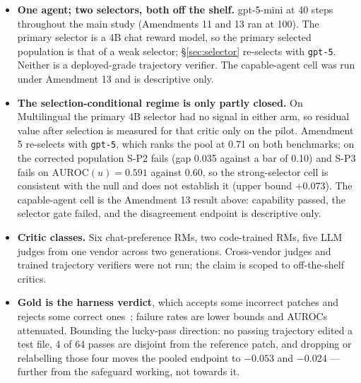 \documentclass[10pt]{article}
\begin{document}
\begin{itemize}[leftmargin=1.2em,itemsep=0pt]
their picks fail more often than the frozen random picks (0.193 and 0.211 against 0.175); the judges return integer scores and tie at the top on 41 and 38 instances, which the readout breaks toward the first attempt --- broken toward the last, \texttt{gpt-6-sol}'s picks fail at the random rate (0.175) and \texttt{gpt-6-luna}'s at 0.202, so for \texttt{gpt-6-sol} the ``worse than random'' reading depends on the tie rule. With no critic above the selector bar of 0.65, the committed sets hold 17 and 19 failures against a floor of 20, and the cell is reported as descriptive only (primary $\Delta$AUROC $+0.020$ [$-0.120$, $+0.149$] on the judge arm). The objection that the null is specific to weak agents is not answered by an equivalence bound; we read it as re-posed as a question about selectors, which is interpretation, not a registered result.
\item \textbf{One agent; two selectors, both off the shelf.} gpt-5-mini at 40 steps throughout the main study (Amendments 11 and 13 ran at 100). The primary selector is a 4B chat reward model, so the primary selected population is that of a weak selector; \S\ref{sec:selector} re-selects with \texttt{gpt-5}. Neither is a deployed-grade trajectory verifier. The capable-agent cell was run under Amendment 13 and is descriptive only.
\item \textbf{The selection-conditional regime is only partly closed.} On Multilingual the primary 4B selector had no signal in either arm, so residual value after selection is measured for that critic only on the pilot. Amendment 5 re-selects with \texttt{gpt-5}, which ranks the pool at 0.71 on both benchmarks; on the corrected population S-P2 fails (gap 0.035 against a bar of 0.10) and S-P3 fails on $\mathrm{AUROC}(u)=0.591$ against 0.60, so the strong-selector cell is consistent with the null and does not establish it (upper bound $+0.073$). The capable-agent cell is the Amendment 13 result above: capability passed, the selector gate failed, and the disagreement endpoint is descriptive only.
\item \textbf{Critic classes.} Six chat-preference RMs, two code-trained RMs, five LLM judges from one vendor across two generations. Cross-vendor judges and trained trajectory verifiers were not run; the claim is scoped to off-the-shelf critics.
\item \textbf{Gold is the harness verdict}, which accepts some incorrect patches and rejects some correct ones~\citep{wang2025solved,rajan2026auditing,agentlens2026}; failure rates are lower bounds and AUROCs attenuated. Bounding the lucky-pass direction: no passing trajectory edited a test file, 4 of 64 passes are disjoint from the reference patch, and dropping or relabelling those four moves the pooled endpoint to $-0.053$ and $-0.024$ --- further from the safeguard working, not towards it.

\end{itemize}
\end{document}
